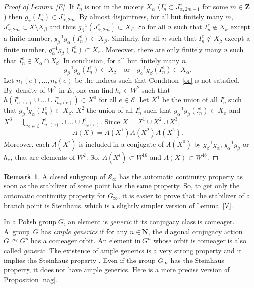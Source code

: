 \documentclass[JEP,XML,SOM,Unicode,NoFloatCountersInSection]{cedram}
\let\mathcal\mathscr
\theoremstyle{plain}
\theoremstyle{definition}
\newtheorem{rem}[thm]{Remark}
\newcommand{\NN}{\mathbf{N}}
\newcommand{\ZZ}{\mathbf{Z}}
\newcommand{\cE}{\mathcal{E}}
\newcommand{\cS}{\mathcal{S}}
\newcommand{\sinf}{\cS_\infty}
\let\action\curvearrowright
\begin{document}
\begin{proof}[Proof of Lemma~\ref{E}]
If $I_n^e$ is not in the moiety $X_\alpha$ (\ie $I_n^e\subset J^e_{\alpha,2m-1}$ for some $m\in\ZZ$) then $g_\alpha(I_n^e)\subset J^e_{\alpha,2m}$. By almost disjointness, for all but finitely many $m$, $J^e_{\alpha,2m}\subset X\setminus X_\beta$ and thus $g_\beta^{-1}(J^e_{\alpha,2m})\subset X_\beta$. So for all $n$ such that $I_n^e\notin X_\alpha$ except a finite number, $g
_\beta^{-1}g_\alpha(I_n^e)\subset X_\beta$. Similarly, for all $n$ such that $I_n^e\notin X_\beta$ except a finite number, $g
_\alpha^{-1}g_\beta(I_n^e)\subset X_\alpha$. Moreover, there are only finitely many $n$ such that $I_n^e\in X_\alpha\cap X_\beta$. In conclusion, for all but finitely many $n$,
\begin{equation}\label{or}g_\beta^{-1}g_\alpha(I_n^e)\subset X_\beta\quad\textrm{or} \quad g
_\alpha^{-1}g_\beta(I_n^e)\subset X_\alpha.
\end{equation}
Let $n_1(e),\dots,n_k(e)$ be the indices such that Condition~\eqref{or} is not satisfied. By~density of $W^2$ in $E$, one can find $h_e\in W^2$ such that $h(I_{n_1(e)}^e\cup\dots\cup I_{n_k(e)}^e)\subset X^0$ for all $e\in\cE$. Let $X^1$ be the union of all $I_n^e$ such that $g_\beta^{-1}g_\alpha(I_n^e)\subset X_\beta$, $X^2$ the union of all $I_n^e$ such that $g
_\alpha^{-1}g_\beta(I_n^e)\subset X_\alpha$ and $X^3=\bigcup_{e\in\cE}I_{n_1(e)}^e\cup\dots\cup I_{n_k(e)}^e$. Since $X=X^1\cup X^2\cup X^3$,
\[
A(X)=A(X^1)A(X^2)A(X^3).
\]
Moreover, each $A(X^i)$ is included in a conjugate of $A(X^0)$ by $g_\beta^{-1}g_\alpha$, $g
_\alpha^{-1}g_\beta$ or $h_e$, that are elements of $W^2$. So, $A(X^i)\subset W^{16}$ and $A(X)\subset W^{48}$.
\end{proof}

\begin{rem}A closed subgroup of $\sinf$ has the automatic continuity property as soon as the stabilizer of some point has the same property. So, to get only the automatic continuity property for $G_\infty$, it is easier to prove that the stabilizer of a branch point is Steinhaus, which is a slightly simpler version of Lemma~\ref{V}.
\end{rem}

In a Polish group $G$, an element is \emph{generic} if its conjugacy class is comeager. A~group~$G$ has \emph{ample generics} if for any $n\in\NN$, the diagonal conjugacy action $G\action G^n$ has a comeager orbit. An element in $G^n$ whose orbit is comeager is also called \emph{generic}. The existence of ample generics is a very strong property and it implies the Steinhaus property \cite{Kechris-Rosendal}. Even if the group $G_\infty$ has the Steinhaus property, it does not have ample generics. Here is a more precise version of Proposition \ref{nag}.
\end{document}
